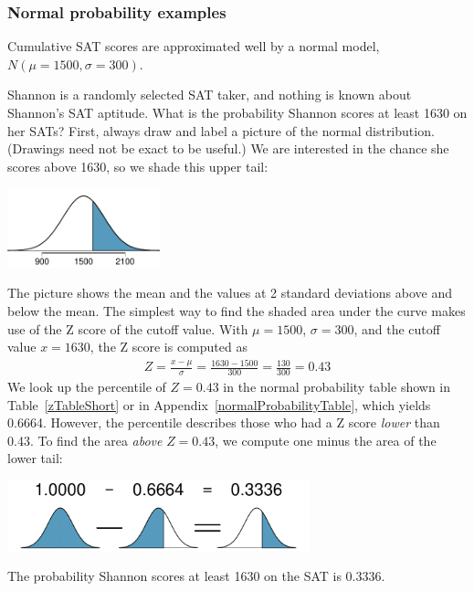 \subsubsection{Normal probability examples}

Cumulative SAT scores are approximated well by a normal model, $N(\mu=1500, \sigma=300)$.

\begin{example}{Shannon is a randomly selected SAT taker, and nothing is known about Shannon's SAT aptitude. What is the probability Shannon scores at least 1630 on her SATs?}\label{satAbove1630Exam}
First, always draw and label a picture of the normal distribution. (Drawings need not be exact to be useful.) We are interested in the chance she scores above 1630, so we shade this upper tail:
\begin{center}
\includegraphics[height=0.9in]{03/figures/satAbove1630/satAbove1630}
\end{center}
The picture shows the mean and the values at 2 standard deviations above and below the mean. The simplest way to find the shaded area under the curve makes use of the Z score of the cutoff value. With $\mu=1500$, $\sigma=300$, and the cutoff value $x=1630$, the Z score is computed as
\begin{eqnarray*}
Z = \frac{x - \mu}{\sigma} = \frac{1630 - 1500}{300} = \frac{130}{300} = 0.43
\end{eqnarray*}
We look up the percentile of $Z=0.43$ in the normal probability table shown in Table~\ref{zTableShort} or in Appendix~\vref{normalProbabilityTable}, which yields 0.6664. However, the percentile describes those who had a Z score \emph{lower} than 0.43. To find the area \emph{above} $Z=0.43$, we compute one minus the area of the lower tail:
\begin{center}
\includegraphics[height=0.8in]{03/figures/subtractingArea/subtractingArea}
\end{center}
The probability Shannon scores at least 1630 on the SAT is 0.3336.
\end{example}

